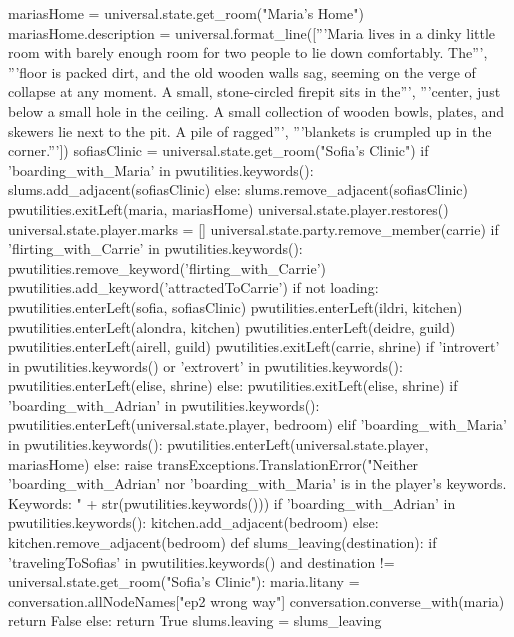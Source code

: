 \documentclass{book}
\begin{document}
\begin{openScene}
    mariasHome = universal.state.get_room("Maria's Home")
    mariasHome.description = universal.format_line(['''Maria lives in a dinky little room with barely enough room for two people to lie down comfortably. The''',
    '''floor is packed dirt, and the old wooden walls sag, seeming on the verge of collapse at any moment. A small, stone-circled firepit sits in the''',
    '''center, just below a small hole in the ceiling. A small collection of wooden bowls, plates, and  skewers lie next to the pit. A pile of ragged''',
    '''blankets is crumpled up in the corner.'''])
    sofiasClinic = universal.state.get_room("Sofia's Clinic")
    if 'boarding_with_Maria' in pwutilities.keywords():
        slums.add_adjacent(sofiasClinic)
    else:
        slums.remove_adjacent(sofiasClinic)
        pwutilities.exitLeft(maria, mariasHome)
    universal.state.player.restores()
    universal.state.player.marks = []
    universal.state.party.remove_member(carrie)
    if 'flirting_with_Carrie' in pwutilities.keywords():
        pwutilities.remove_keyword('flirting_with_Carrie')
        pwutilities.add_keyword('attractedToCarrie')
    if not loading:
        pwutilities.enterLeft(sofia, sofiasClinic)
        pwutilities.enterLeft(ildri, kitchen)
        pwutilities.enterLeft(alondra, kitchen)
        pwutilities.enterLeft(deidre, guild)
        pwutilities.enterLeft(airell, guild)
        pwutilities.exitLeft(carrie, shrine)
        if 'introvert' in pwutilities.keywords() or 'extrovert' in pwutilities.keywords():
            pwutilities.enterLeft(elise, shrine)
        else:
            pwutilities.exitLeft(elise, shrine)
        if 'boarding_with_Adrian' in pwutilities.keywords():
            pwutilities.enterLeft(universal.state.player, bedroom)
        elif 'boarding_with_Maria' in pwutilities.keywords():
            pwutilities.enterLeft(universal.state.player, mariasHome)
        else:
            raise transExceptions.TranslationError("Neither 'boarding_with_Adrian' nor 'boarding_with_Maria' is in the player's keywords. Keywords: " + str(pwutilities.keywords()))
    if 'boarding_with_Adrian' in pwutilities.keywords():
        kitchen.add_adjacent(bedroom)
    else:
        kitchen.remove_adjacent(bedroom)
    def slums_leaving(destination):
        if 'travelingToSofias' in pwutilities.keywords() and destination != universal.state.get_room("Sofia's Clinic"):
            maria.litany = conversation.allNodeNames["ep2 wrong way"]
            conversation.converse_with(maria)
            return False
        else:
            return True
    slums.leaving = slums_leaving
    
\end{openScene}
\end{document}
